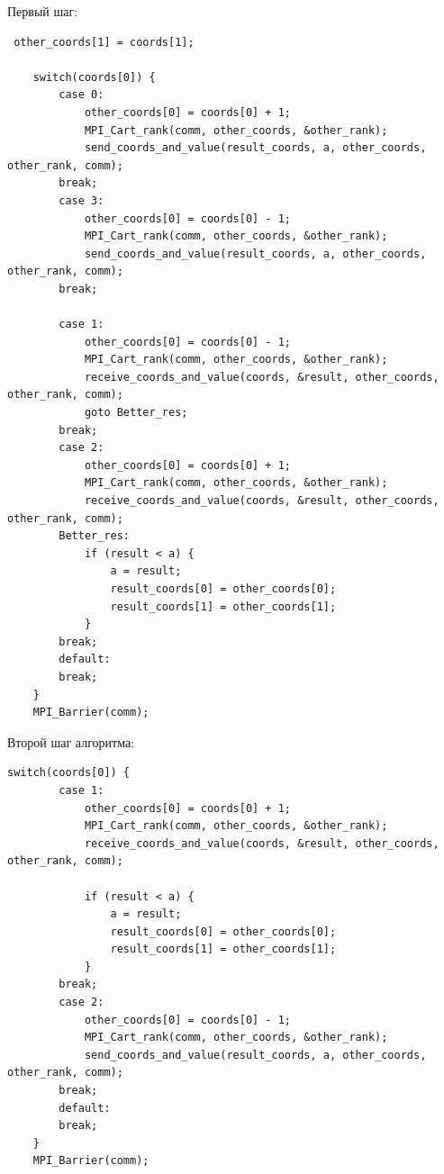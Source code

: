 \documentclass[a4paper]{article}
\begin{document}
Первый шаг:
\begin{lstlisting}
 other_coords[1] = coords[1];
    
    switch(coords[0]) {
        case 0:
            other_coords[0] = coords[0] + 1;
            MPI_Cart_rank(comm, other_coords, &other_rank);
            send_coords_and_value(result_coords, a, other_coords, other_rank, comm);
        break;
        case 3:
            other_coords[0] = coords[0] - 1;
            MPI_Cart_rank(comm, other_coords, &other_rank);
            send_coords_and_value(result_coords, a, other_coords, other_rank, comm);
        break;
            
        case 1:
            other_coords[0] = coords[0] - 1;
            MPI_Cart_rank(comm, other_coords, &other_rank);
            receive_coords_and_value(coords, &result, other_coords, other_rank, comm);
            goto Better_res;
        break;
        case 2:
            other_coords[0] = coords[0] + 1;
            MPI_Cart_rank(comm, other_coords, &other_rank);
            receive_coords_and_value(coords, &result, other_coords, other_rank, comm);
        Better_res:
            if (result < a) {
                a = result;
                result_coords[0] = other_coords[0];
                result_coords[1] = other_coords[1];
            }
        break;
        default:
        break;
    }
    MPI_Barrier(comm);
\end{lstlisting}

\newpage
Второй шаг алгоритма:
\begin{lstlisting}
switch(coords[0]) {
        case 1:
            other_coords[0] = coords[0] + 1;
            MPI_Cart_rank(comm, other_coords, &other_rank);
            receive_coords_and_value(coords, &result, other_coords, other_rank, comm);
            
            if (result < a) {
                a = result;
                result_coords[0] = other_coords[0];
                result_coords[1] = other_coords[1];
            }
        break;
        case 2:
            other_coords[0] = coords[0] - 1;
            MPI_Cart_rank(comm, other_coords, &other_rank);
            send_coords_and_value(result_coords, a, other_coords, other_rank, comm);
        break;
        default:
        break;
    }
    MPI_Barrier(comm);
\end{lstlisting}
\end{document}
